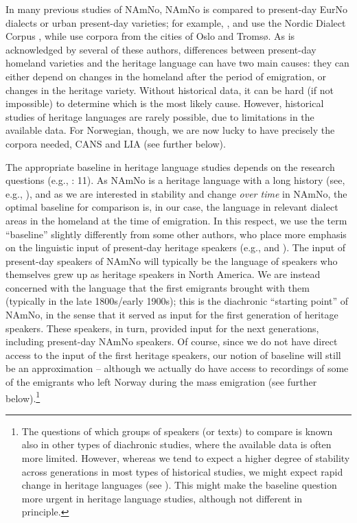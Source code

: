 \documentclass[output=paper]{langscibook}
\begin{document}
In many previous studies of NAmNo, NAmNo is compared to present-day \mbox{EurNo} dialects or urban present-day varieties; for example, \citet{LarssonJohannessen2015Incomplete}, \citet{vanBaal2020} and \citet{Lykke2020} use the Nordic Dialect Corpus \citep{JohannessenEtAl2009}, while \citet{AnderssenWestergaard2020} use corpora from the cities of Oslo and Tromsø. As is acknowledged by several of these authors, differences between present-day homeland varieties and the heritage language can have two main causes: they can either depend on changes in the homeland after the period of emigration, or changes in the heritage variety. Without historical data, it can be hard (if not impossible) to determine which is the most likely cause. However, historical studies of heritage languages are rarely possible, due to limitations in the available data. For Norwegian, though, we are now lucky to have precisely the corpora needed, CANS \citep{Johannessen2015CANS} and LIA (see further below). 

The appropriate baseline in heritage language studies depends on the research questions (e.g., \citealt{Polinsky2018}: 11). As NAmNo is a heritage language with a long history (see, e.g., ), and as we are interested in stability and change \textit{over time} in NAmNo, the optimal baseline for comparison is, in our case, the language in relevant dialect areas in the homeland at the time of emigration. In this respect, we use the term “baseline” slightly differently from some other authors, who place more emphasis on the linguistic input of present-day heritage speakers (e.g.,  and ). The input of present-day speakers of NAmNo will typically be the language of speakers who themselves grew up as heritage speakers in North America. We are instead concerned with the language that the first emigrants brought with them (typically in the late 1800s\slash early 1900s); this is the diachronic “starting point” of NAmNo, in the sense that it served as input for the first generation of heritage speakers. These speakers, in turn, provided input for the next generations, including present-day NAmNo speakers. Of course, since we do not have direct access to the input of the first heritage speakers, our notion of baseline will still be an approximation – although we actually do have access to recordings of some of the emigrants who left Norway during the mass emigration (see further below).\footnote{The questions of which groups of speakers (or texts) to compare is known also in other types of diachronic studies, where the available data is often more limited. However, whereas we tend to expect a higher degree of stability across generations in most types of historical studies, we might expect rapid change in heritage languages (see \citealt{KupischPolinsky2022}). This might make the baseline question more urgent in heritage language studies, although not different in principle.} 
\end{document}
